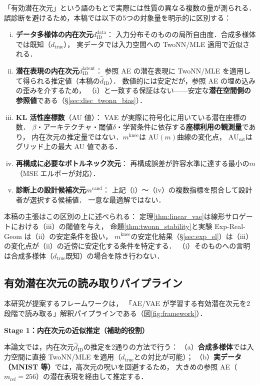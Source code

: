 \documentclass[11pt,a4paper]{jsarticle}
\newcommand{\dzopt}{m^{\mathrm{cand}}}
\newcommand{\dtrue}{d_{\mathrm{true}}}
\newcommand{\AUsat}{\mathrm{AU}_{\mathrm{sat}}}
\newcommand{\mknee}{m^{\mathrm{knee}}}
\begin{document}
「有効潜在次元」という語のもとで実際には性質の異なる複数の量が測られる．
誤診断を避けるため，本稿では以下の5つの対象量を明示的に区別する：
\begin{enumerate}[(i)]
  \item \textbf{データ多様体の内在次元}$d_\mathrm{ID}^\mathrm{data}$：
        入力分布そのものの局所自由度．合成多様体では既知（$\dtrue$），
        実データでは入力空間への TwoNN/MLE 適用で近似される．
  \item \textbf{潜在表現の内在次元}$d_\mathrm{ID}^\mathrm{latent}$：
        参照 AE の潜在表現に TwoNN/MLE を適用して得られる推定値（本稿の$\hat{d}_\mathrm{ID}$）．
        数値的には安定だが，参照 AE の埋め込みの歪みを介するため，
        （i）と一致する保証はない——安定な\textbf{潜在空間側の参照値}である（§\ref{sec:disc_twonn_bias}）．
  \item \textbf{KL 活性座標数}（AU 値）：
        VAE が実際に符号化に用いている潜在座標の数．
        $\beta$・アーキテクチャ・閾値$\delta$・学習条件に依存する\textbf{座標利用の観測量}であり，
        内在次元の推定量ではない．$\mknee$は AU$(m)$曲線の変化点，
        $\AUsat$はグリッド上の最大 AU 値である．
  \item \textbf{再構成に必要なボトルネック次元}：
        再構成誤差が許容水準に達する最小の$m$（MSE エルボーが対応）．
  \item \textbf{診断上の設計候補次元}$\dzopt$：
        上記（i）〜（iv）の複数指標を照合して設計者が選択する候補値．
        一意な最適解ではない．
\end{enumerate}
本稿の主張はこの区別の上に述べられる：
定理\ref{thm:linear_vae}は線形サロゲートにおける（iii）の閾値を与え，
命題\ref{thm:twonn_stability}と実験 Exp-Real-Geom は（ii）の安定条件を扱い，
$\mknee$の安定化結果（§\ref{sec:exp_el}）は（iii）の変化点が（ii）の近傍に安定化する条件を特定する．
（i）そのものへの言明は合成多様体（$\dtrue$既知）の場合を除き行わない．

\subsection{有効潜在次元の読み取りパイプライン}\label{sec:framework_pipeline}

本研究が提案するフレームワークは，
「AE/VAE が学習する有効潜在次元を2段階で読み取る」解釈パイプラインである（図\ref{fig:framework}）．

\textbf{Stage 1：内在次元の近似推定（補助的役割）}

本論文では，内在次元$\hat{d}_\mathrm{ID}$の推定を2通りの方法で行う：
（a）\textbf{合成多様体}では入力空間に直接 TwoNN/MLE を適用（$\dtrue$との対比が可能）；
（b）\textbf{実データ（MNIST 等）}では，高次元の呪いを回避するため，
大きめの参照 AE（$m_{\mathrm{ref}} = 256$）の潜在表現を経由して推定する．
\end{document}
